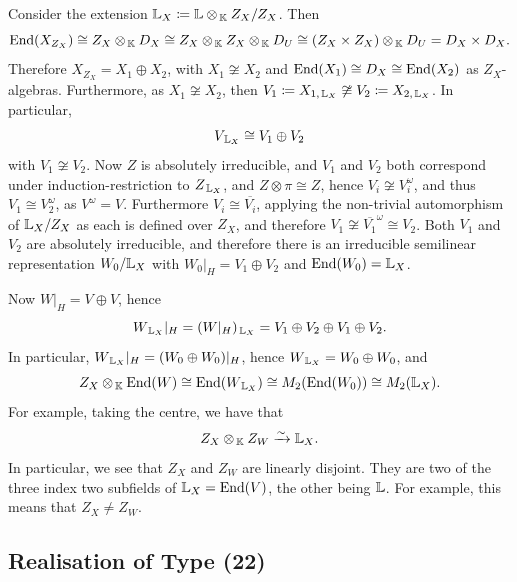 Consider the extension ${\mathbb L}_X \coloneqq {\mathbb L} \otimes_{\, {\mathbb K}} Z_X / Z_X$. Then
\[
\operatorname{End}(X_{Z_X}) \cong Z_X \otimes_{\, {\mathbb K}} D_X \cong Z_X \otimes_{\, {\mathbb K}} Z_X \otimes_{\, {\mathbb K}} D_U \cong (Z_X \times Z_X) \otimes_{\, {\mathbb K}} D_U = D_X \times D_X.
\]
Therefore $X_{Z_X} = X_1 \oplus X_2$, with $X_1 \not\cong X_2$ and $\operatorname{End}(X_1) \cong D_X \cong \operatorname{End}(X_2)$ as $Z_X$-algebras. Furthermore, as $X_1 \not\cong X_2$, then $V_1 \coloneqq X_{1, \, {\mathbb L}_X} \not\cong V_2 \coloneqq X_{2, \, {\mathbb L}_X}$. In particular,
\[
V_{\, {\mathbb L}_X} \cong V_1 \oplus V_2
\]
with $V_1 \not\cong V_2$. Now $Z$ is absolutely irreducible, and $V_1$ and $V_2$ both correspond under induction-restriction to $Z_{\, {\mathbb L}_X}$, and $Z \otimes \pi \cong Z$, hence $V_i \not\cong V_i^{\omega}$, and thus $V_1 \cong V_2^{\omega}$, as $V^{\omega} = V$. Furthermore $V_i \cong \overline{V_i}$, applying the non-trivial automorphism of ${\mathbb L}_X / Z_X$ as each is defined over $Z_X$, and therefore $V_1 \not\cong \overline{V_1}^{\omega} \cong V_2$. Both $V_1$ and $V_2$ are absolutely irreducible, and therefore there is an irreducible semilinear representation $W_0 / {\mathbb L}_X$ with $W_0|_H = V_1 \oplus V_2$ and $\operatorname{End}(W_0) = {\mathbb L}_X$.

Now $W|_H = V \oplus V$, hence
\[
W_{\, {\mathbb L}_X}|_H = (W|_H)_{\, {\mathbb L}_X} = V_1 \oplus V_2 \oplus V_1 \oplus V_2.
\]
In particular, $W_{\, {\mathbb L}_X}|_H = (W_0 \oplus W_0)|_H$, hence $W_{\, {\mathbb L}_X} = W_0 \oplus W_0$, and
\[
Z_X \otimes_{\, {\mathbb K}} \operatorname{End}(W) \cong \operatorname{End}(W_{\, {\mathbb L}_X}) \cong M_2(\operatorname{End}(W_0)) \cong M_2({\mathbb L}_X).
\]
For example, taking the centre, we have that 
\[
Z_X \otimes_{\, {\mathbb K}} Z_W \xrightarrow{\sim} {\mathbb L}_X.
\]
In particular, we see that $Z_X$ and $Z_W$ are linearly disjoint. They are two of the three index two subfields of ${\mathbb L}_X = \operatorname{End}(V)$, the other being ${\mathbb L}$. For example, this means that $Z_X \neq Z_W$.

\subsection{Realisation of Type (22)}

